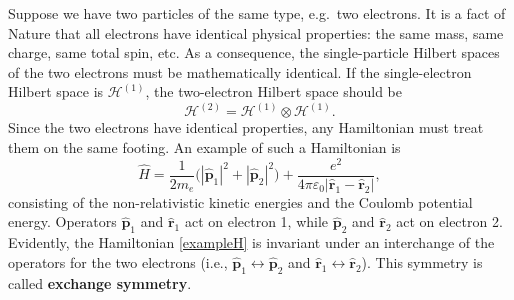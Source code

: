 \documentclass[prx,12pt]{revtex4-2}
\begin{document}
Suppose we have two particles of the same type, e.g.~two electrons.
It is a fact of Nature that all electrons have identical physical
properties: the same mass, same charge, same total spin, etc.  As a
consequence, the single-particle Hilbert spaces of the two electrons
must be mathematically identical.  If the single-electron Hilbert
space is $\mathscr{H}^{(1)}$, the two-electron Hilbert space should be
\begin{equation}
  \mathscr{H}^{(2)} = \mathscr{H}^{(1)} \otimes \mathscr{H}^{(1)}.
\end{equation}
Since the two electrons have identical properties, any Hamiltonian
must treat them on the same footing.  An example of such a Hamiltonian
is
\begin{equation}
  \hat{H} = \frac{1}{2m_e} \Big(|\hat{\mathbf{p}}_1|^2 + |\hat{\mathbf{p}}_2|^2\Big) + \frac{e^2}{4\pi\varepsilon_0|\hat{\mathbf{r}}_1 - \hat{\mathbf{r}}_2|},
  \label{exampleH}
\end{equation}
consisting of the non-relativistic kinetic energies and the Coulomb
potential energy.  Operators $\hat{\mathbf{p}}_1$ and
$\hat{\mathbf{r}}_1$ act on electron 1, while $\hat{\mathbf{p}}_2$ and
$\hat{\mathbf{r}}_2$ act on electron 2.  Evidently, the Hamiltonian
\eqref{exampleH} is invariant under an interchange of the operators
for the two electrons (i.e., $\hat{\mathbf{p}}_1 \leftrightarrow
\hat{\mathbf{p}}_2$ and $\hat{\mathbf{r}}_1 \leftrightarrow
\hat{\mathbf{r}}_2$).  This symmetry is called \textbf{exchange
  symmetry}.
\end{document}
